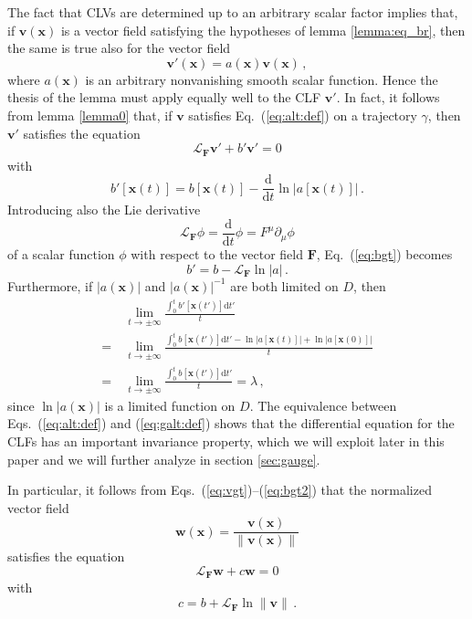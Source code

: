 \documentclass{article}
\theoremstyle{plain}
\theoremstyle{definition}
\theoremstyle{remark}
\newcommand{\vect}[1]{\boldsymbol{#1}}
\begin{document}
The fact that CLVs are determined up to an arbitrary scalar factor
implies that, if $\vect{v}(\vect{x})$ is a vector field satisfying the
hypotheses of lemma \ref{lemma:eq_br}, then the same is true
also for the vector field 
\begin{equation}\label{eq:vgt}
\vect{v}'(\vect{x})=a(\vect{x})\vect{v}(\vect{x}) \, ,
\end{equation}
where $a(\vect{x})$ is an arbitrary nonvanishing smooth scalar function.
Hence the thesis of the lemma must apply equally well to the CLF
$\vect{v}'$. In fact, it follows from lemma \ref{lemma0} that, if
$\vect{v}$ satisfies Eq.~(\ref{eq:alt:def}) on a trajectory $\gamma$,  
then $\vect{v}'$ satisfies the equation
\begin{equation}\label{eq:galt:def}
\mathcal{L}_{\vect{F}}\vect{v}' + b' \vect v' = 0
\end{equation}
with 
\begin{equation}\label{eq:bgt}
  b'\left[\vect{x}(t)\right]
=b\left[\vect{x}(t)\right] -\frac{\mathrm{d}}{\mathrm{d} t} 
\ln\left|a\left[\vect{x}(t)\right]\right|   \, .
\end{equation}
Introducing also the Lie derivative 
\[
\mathcal{L}_{\vect{F}}\phi=\frac{\mathrm{d}}{\mathrm{d} t}\phi
=F^\mu \partial_\mu \phi
\]
of a scalar function $\phi$ with respect to the vector field $\vect{F}$,
Eq.~(\ref{eq:bgt}) becomes
\begin{equation}\label{eq:bgt2}
b'=b -\mathcal{L}_{\vect{F}} \ln\left|a\right|\,.
\end{equation}
Furthermore, if 
$|a(\vect{x})|$ and $|a(\vect{x})|^{-1}$ are both limited on $D$, then
\begin{align*}
 &\lim_{t\to \pm\infty}\frac{\int_0^t b'\left[\vect{x}(t')\right]{\mathrm{d}}t'}{t}\\
    =\ &\lim_{t\to \pm\infty}\frac{\int_0^t b\left[\vect{x}(t')\right]{\mathrm{d}}t'
-\ln\left|a\left[\vect{x}(t)\right]\right|+\ln\left|a\left[\vect{x}(0)\right]\right|}{t} \\
=\ &\lim_{t\to \pm\infty}\frac{\int_0^t b\left[\vect{x}(t')\right]{\mathrm{d}}t'}{t}
=\lambda \, ,
\end{align*}
since $\ln|a(\vect{x})|$ is a limited function on $D$.  The
equivalence between Eqs.~(\ref{eq:alt:def}) and (\ref{eq:galt:def})
shows that the differential equation for the CLFs has an important
invariance property, which we will exploit later in this paper and we
will further analyze in section \ref{sec:gauge}.

In particular, it follows from Eqs.~(\ref{eq:vgt})--(\ref{eq:bgt2}) that the
normalized vector field 
\begin{equation}\label{eq:wnorm}
\vect{w}(\vect{x})=\frac
{\vect{v}(\vect{x})}{\lVert \vect{v}\left(\vect {x}\right) \rVert}
\end{equation}
satisfies the equation 
\begin{equation}\label{eq:walt:def}
\mathcal{L}_{\vect{F}}\vect{w} + c \vect w = 0
\end{equation}
with
\begin{equation}\label{eq:cgt2}
c=b +\mathcal{L}_{\vect{F}} \ln\lVert\vect v\rVert\,.
\end{equation}
\end{document}
